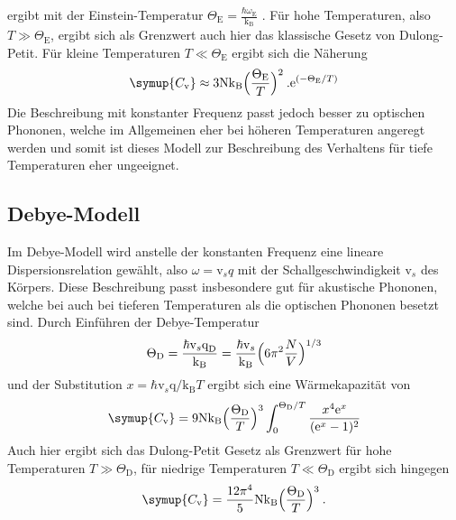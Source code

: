 ergibt mit der Einstein-Temperatur
$\Theta_{\text{E}} = \frac{\hbar\omega_{\text{E}}}{\text{k}_{\text{B}}}$ .
Für hohe Temperaturen, also $T \gg \Theta_{\text{E}}$, ergibt sich als Grenzwert
auch hier das klassische Gesetz von Dulong-Petit. Für kleine Temperaturen
$T \ll \Theta_{\text{E}}$ ergibt sich die Näherung
\begin{equation}
  \symup{C_{\text{v}}} \approx 3\text{N}\text{k}_{\text{B}}\Bigl(\frac{\Theta_{\text{E}}}{T}\Bigr)^2 \: .
  \text{e}^{(-\Theta_{\text{E}}/T)}
  \label{eqn:ChochE}
\end{equation}
Die Beschreibung mit konstanter Frequenz passt jedoch besser zu optischen Phononen,
welche im Allgemeinen eher bei höheren Temperaturen angeregt werden und somit ist
dieses Modell zur Beschreibung des
Verhaltens für tiefe Temperaturen eher ungeeignet.

\subsection{Debye-Modell}
Im Debye-Modell wird anstelle der konstanten Frequenz eine lineare Dispersionsrelation
gewählt, also $ \omega = \text{v}_sq$ mit der Schallgeschwindigkeit
$\text{v}_s$ des Körpers. Diese Beschreibung passt insbesondere gut für
akustische Phononen, welche bei auch bei tieferen Temperaturen als die optischen Phononen
besetzt sind.
Durch Einführen der Debye-Temperatur
\begin{equation}
  \Theta_{\text{D}} = \frac{\hbar\text{v}_s\text{q}_{\text{D}}}{\text{k}_{\text{B}}}
  = \frac{\hbar\text{v}_s}{\text{k}_{\text{B}}}\Bigl(6\pi^2\frac{N}{V}\Bigr)^{1/3}
  \label{eqn:TDebye}
\end{equation}
und der Substitution $ x=\hbar\text{v}_s\text{q} /\text{k}_{\text{B}}T $
ergibt sich eine Wärmekapazität von
\begin{equation}
  \symup{C_{\text{v}}} = 9\text{N}\text{k}_{\text{B}}\Bigl(\frac{\Theta_{\text{D}}}{T}\Bigr)^3
  \int_0^{\Theta_{\text{D}}/T} \frac{x^4\text{e}^x}{(\text{e}^x-1)^2}
  \label{eqn:CDebye}
\end{equation}
Auch hier ergibt sich das Dulong-Petit Gesetz als Grenzwert für hohe Temperaturen
$T \gg \Theta_{\text{D}}$, für niedrige Temperaturen $T \ll \Theta_{\text{D}}$ ergibt sich hingegen
\begin{equation}
  \symup{C_{\text{v}}} = \frac{12\pi^4}{5}\text{N}\text{k}_{\text{B}}\Bigl(\frac{\Theta_{\text{D}}}{T}\Bigr)^3 \:.
  \label{eqn:ChochD}
\end{equation}
